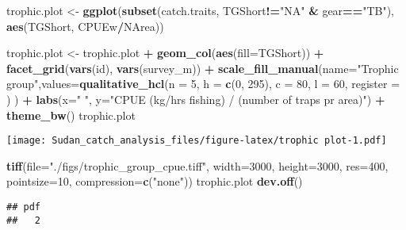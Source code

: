 \documentclass[]{article}
\newenvironment{Shaded}{\begin{snugshade}}{\end{snugshade}}
\newcommand{\KeywordTok}[1]{\textcolor[rgb]{0.13,0.29,0.53}{\textbf{#1}}}
\newcommand{\DataTypeTok}[1]{\textcolor[rgb]{0.13,0.29,0.53}{#1}}
\newcommand{\DecValTok}[1]{\textcolor[rgb]{0.00,0.00,0.81}{#1}}
\newcommand{\StringTok}[1]{\textcolor[rgb]{0.31,0.60,0.02}{#1}}
\newcommand{\OperatorTok}[1]{\textcolor[rgb]{0.81,0.36,0.00}{\textbf{#1}}}
\newcommand{\NormalTok}[1]{#1}
\begin{document}
\begin{Shaded}
\begin{Highlighting}[]
\NormalTok{trophic.plot <-}\StringTok{ }\KeywordTok{ggplot}\NormalTok{(}\KeywordTok{subset}\NormalTok{(catch.traits, TGShort}\OperatorTok{!=}\StringTok{"NA"} \OperatorTok{&}\StringTok{ }\NormalTok{gear}\OperatorTok{==}\StringTok{"TB"}\NormalTok{), }\KeywordTok{aes}\NormalTok{(TGShort, CPUEw}\OperatorTok{/}\NormalTok{NArea))}

\NormalTok{trophic.plot <-}\StringTok{ }\NormalTok{trophic.plot }\OperatorTok{+}\StringTok{ }\KeywordTok{geom_col}\NormalTok{(}\KeywordTok{aes}\NormalTok{(}\DataTypeTok{fill=}\NormalTok{TGShort)) }\OperatorTok{+}\StringTok{ }\KeywordTok{facet_grid}\NormalTok{(}\KeywordTok{vars}\NormalTok{(id), }\KeywordTok{vars}\NormalTok{(survey_m)) }\OperatorTok{+}\StringTok{ }\KeywordTok{scale_fill_manual}\NormalTok{(}\DataTypeTok{name=}\StringTok{"Trophic group"}\NormalTok{,}\DataTypeTok{values=}\KeywordTok{qualitative_hcl}\NormalTok{(}\DataTypeTok{n =} \DecValTok{5}\NormalTok{, }\DataTypeTok{h =} \KeywordTok{c}\NormalTok{(}\DecValTok{0}\NormalTok{, }\DecValTok{295}\NormalTok{), }\DataTypeTok{c =} \DecValTok{80}\NormalTok{, }\DataTypeTok{l =} \DecValTok{60}\NormalTok{, }\DataTypeTok{register =}\NormalTok{ ) ) }\OperatorTok{+}\StringTok{ }\KeywordTok{labs}\NormalTok{(}\DataTypeTok{x=}\StringTok{" "}\NormalTok{, }\DataTypeTok{y=}\StringTok{"CPUE (kg/hrs fishing) / (number of traps pr area)"}\NormalTok{) }\OperatorTok{+}\StringTok{ }\KeywordTok{theme_bw}\NormalTok{() }
\NormalTok{trophic.plot}
\end{Highlighting}
\end{Shaded}

\texttt{[image: Sudan\_catch\_analysis\_files/figure-latex/trophic plot-1.pdf]}

\begin{Shaded}
\begin{Highlighting}[]
\KeywordTok{tiff}\NormalTok{(}\DataTypeTok{file=}\StringTok{"./figs/trophic_group_cpue.tiff"}\NormalTok{, }\DataTypeTok{width=}\DecValTok{3000}\NormalTok{, }\DataTypeTok{height=}\DecValTok{3000}\NormalTok{, }\DataTypeTok{res=}\DecValTok{400}\NormalTok{, }\DataTypeTok{pointsize=}\DecValTok{10}\NormalTok{, }\DataTypeTok{compression=}\KeywordTok{c}\NormalTok{(}\StringTok{"none"}\NormalTok{))}
\NormalTok{trophic.plot}
\KeywordTok{dev.off}\NormalTok{()}
\end{Highlighting}
\end{Shaded}

\begin{verbatim}
## pdf 
##   2
\end{verbatim}
\end{document}

